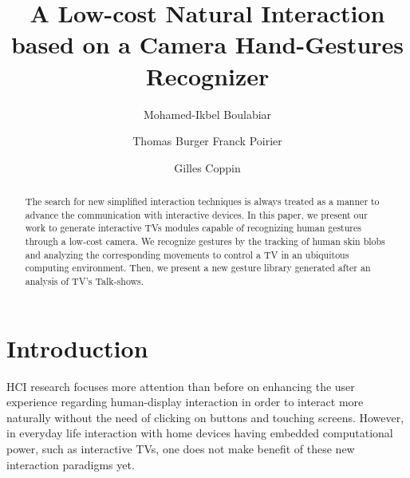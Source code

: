 \documentclass{llncs}
\newcommand\ignore[1]{}
\begin{document}
\frontmatter          %
\pagestyle{headings}  %
\mainmatter              %
%
\title{A Low-cost Natural Interaction based on a Camera Hand-Gestures Recognizer}
\author{Mohamed-Ikbel Boulabiar \and Thomas Burger
Franck Poirier \and Gilles Coppin}
%

\maketitle

\begin{abstract}
The search for new simplified interaction techniques is always treated as a
manner to advance the communication with interactive devices.
In this paper, we present our work to generate interactive TVs modules capable of
recognizing human gestures through a low-cost camera.
We recognize gestures by the tracking of human skin blobs and analyzing the 
corresponding movements to control a TV in an ubiquitous computing environment.
Then, we present a new gesture library generated after an analysis of TV's Talk-shows.

\ignore{
The abstract should summarize the contents of the paper
using at least 70 and at most 150 words. It will be set in 9-point
font size and be inset 1.0 cm from the right and left margins.
There will be two blank lines before and after the Abstract. \dots
}
\end{abstract}
%

\section{Introduction}
HCI research focuses more attention than before on enhancing the user experience regarding human-display interaction in order to interact more naturally without the need of clicking on buttons and touching screens. However, in everyday life interaction with home devices having embedded computational power, such as interactive TVs, one does not make benefit of these new interaction paradigms yet. 
\end{document}
